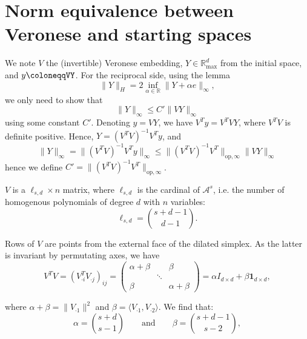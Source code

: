\documentclass[oneside,UKenglish,a4paper]{amsart}
\numberwithin{equation}{section}
\numberwithin{figure}{section}
\theoremstyle{plain}
\theoremstyle{definition}
\theoremstyle{plain}
\theoremstyle{remark}
\theoremstyle{plain}
\theoremstyle{definition}
\theoremstyle{definition}
\begin{document}
\bigskip
\bigskip


\bigskip
\bigskip

\appendix
\section{Norm equivalence between Veronese and starting spaces}\label{appendix:NormEquivalence}

We note $V$ the (invertible) Veronese embedding, $Y\in\mathbb{R}_{\max}^{d}$ from the initial
space, and $y\coloneqqVY$. For the reciprocal side, using the lemma 
\[
\lVert Y\rVert_{H}=2\inf_{\alpha\in\mathbb{R}}\lVert Y+\alpha e\rVert_{\infty},
\]
we only need to show that 
\[
\lVert Y\rVert_{\infty}\le C'\lVert VY\rVert_{\infty}
\]
using some constant $C'$. Denoting $y=VY$, we have $V^{T}y=V^{T}VY$,
where $V^{T}V$ is definite positive. Hence, $Y=(V^{T}V)^{-1}V^{T}y$,
and
\[
\lVert Y\rVert_{\infty}=\lVert(V^{T}V)^{-1}V^{T}y\rVert_{\infty}\le\lVert(V^{T}V)^{-1}V^{T}\rVert_{\text{op},\infty}\lVert VY\rVert_{\infty}
\]
hence we define $C'=\lVert(V^{T}V)^{-1}V^{T}\rVert_{\text{op},\infty}$.

$V$ is a $\ell_{s,d}\times n$ matrix, where $\ell_{s,d}$ is the
cardinal of $\mathcal{A}^{s}$, i.e. the number of homogenous polynomials
of degree $d$ with $n$ variables:
\[
\ell_{s,d}=\binom{s+d-1}{d-1}.
\]

Rows of $V$ are points from the external face of the dilated simplex.
As the latter is invariant by permutating axes, we have
\[
V^{T}V=(V_{\cdot i}^{T}V_{\cdot j})_{ij}=\begin{pmatrix}\alpha+\beta &  & \beta\\
 & \ddots\\
\beta &  & \alpha+\beta
\end{pmatrix}=\alpha I_{d\times d}+\beta\mathbf{1}_{d\times d},
\]

where $\alpha+\beta=\lVert V_{\cdot1}\rVert^{2}$ and $\beta=\langle V_{\cdot1},V_{\cdot2}\rangle$. We find that:
\[
\alpha=\binom{s+d}{s-1}\qquad\text{and}\qquad\beta=\binom{s+d-1}{s-2},
\]

\end{document}
